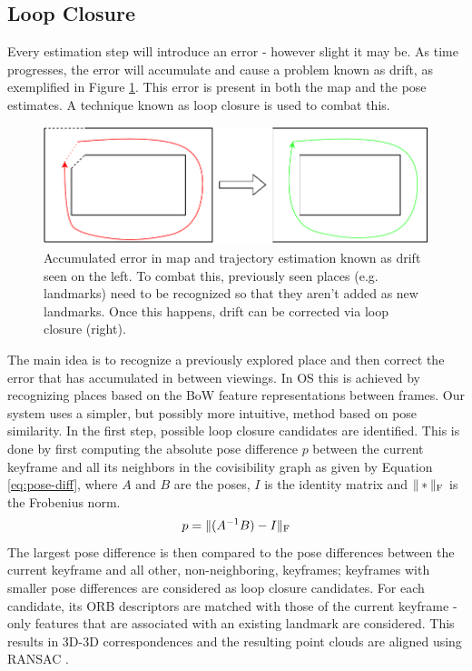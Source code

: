 \documentclass[a4paper, 10pt]{article}
\begin{document}
\subsection{Loop Closure}
\label{sec:orgfb64883}
Every estimation step will introduce an error - however slight it may be. As time progresses, the error will accumulate and cause a problem known as drift, as exemplified in Figure \ref{fig:orgfc6fba8}.
This error is present in both the map and the pose estimates. A technique known as loop closure is used to combat this.
\begin{figure}[htbp]
\centering
\includegraphics[width=0.5\linewidth]{./resources/drift.pdf}
\caption{\label{fig:orgfc6fba8}
Accumulated error in map and trajectory estimation known as drift seen on the left. To combat this, previously seen places (e.g. landmarks) need to be recognized so that they aren't added as new landmarks. Once this happens, drift can be corrected via loop closure (right).}
\end{figure}
The main idea is to recognize a previously explored place and then correct the error that has accumulated in between viewings. 
In OS this is achieved by recognizing places based on the BoW feature representations between frames. Our system uses a simpler, but possibly more intuitive, method based on pose similarity.
In the first step, possible loop closure candidates are identified. This is done by first computing the absolute pose difference \(p\) between the current keyframe and all its neighbors 
in the covisibility graph as given by Equation \ref{eq:pose-diff}, where \(A\) and \(B\) are the poses, \(I\) is the identity matrix and \(\|*\|_{\rm {F}}\) is the Frobenius norm. 
\begin{equation}
\label{eq:pose-diff}
p = \|(A^{-1} B) - I\|_{\rm {F}}
\end{equation}
The largest pose difference is then compared to the pose differences between the current keyframe and all other, non-neighboring, keyframes; 
keyframes with smaller pose differences are considered as loop closure candidates. For each candidate, its ORB descriptors are matched with those of the current keyframe - only features that are associated with an 
existing landmark are considered. This results in 3D-3D correspondences and the resulting point clouds are aligned using RANSAC \cite{ransac}.
\end{document}

